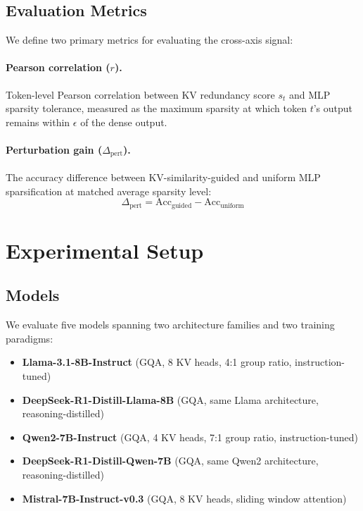 \documentclass[11pt,a4paper]{article}
\begin{document}
\subsection{Evaluation Metrics}

We define two primary metrics for evaluating the cross-axis signal:

\paragraph{Pearson correlation ($r$).}
Token-level Pearson correlation between KV redundancy score $s_t$ and MLP sparsity tolerance, measured as the maximum sparsity at which token $t$'s output remains within $\epsilon$ of the dense output.

\paragraph{Perturbation gain ($\Delta_\text{pert}$).}
The accuracy difference between KV-similarity-guided and uniform MLP sparsification at matched average sparsity level:
\begin{equation}
    \Delta_\text{pert} = \text{Acc}_{\text{guided}} - \text{Acc}_{\text{uniform}}
\end{equation}

\section{Experimental Setup}
\label{sec:setup}

\subsection{Models}

We evaluate five models spanning two architecture families and two training paradigms:

\begin{itemize}
    \item \textbf{Llama-3.1-8B-Instruct} (GQA, 8 KV heads, 4:1 group ratio, instruction-tuned)
    \item \textbf{DeepSeek-R1-Distill-Llama-8B} (GQA, same Llama architecture, reasoning-distilled)
    \item \textbf{Qwen2-7B-Instruct} (GQA, 4 KV heads, 7:1 group ratio, instruction-tuned)
    \item \textbf{DeepSeek-R1-Distill-Qwen-7B} (GQA, same Qwen2 architecture, reasoning-distilled)
    \item \textbf{Mistral-7B-Instruct-v0.3} (GQA, 8 KV heads, sliding window attention)
\end{itemize}
\end{document}
